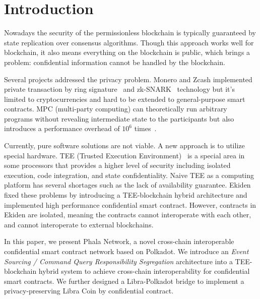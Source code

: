 \section{Introduction}

Nowadays the security of the permissionless blockchain is typically guaranteed by state replication over consensus algorithms. Though this approach works well for blockchain, it also means everything on the blockchain is public, which brings a problem: confidential information cannot be handled by the blockchain.

Several projects addressed the privacy problem. Monero and Zcash implemented private transaction by ring signature~\cite{xxx} and zk-SNARK~\cite{xxx} technology but it's limited to cryptocurrencies and hard to be extended to general-purpose smart contracts. MPC (multi-party computing) can theoretically run arbitrary programs without revealing intermediate state to the participants but also introduces a performance overhead of $10^6$ times~\cite{cheng2019ekiden}.

Currently, pure software solutions are not viable. A new approach is to utilize special hardware. TEE (Trusted Execution Environment)~\cite{teewiki} is a special area in some processors that provides a higher level of security including isolated execution, code integration, and state confidentiality. Naive TEE as a computing platform has several shortages such as the lack of availability guarantee.
Ekiden~\cite{cheng2019ekiden} fixed these problems by introducing a TEE-blockchain hybrid architecture and implemented high performance confidential smart contract. However, contracts in Ekiden are isolated, meaning the contracts cannot interoperate with each other, and cannot interoperate to external blockchains.

In this paper, we present Phala Network, a novel cross-chain interoperable confidential smart contract network based on Polkadot. We introduce an \textit{Event Sourcing / Command Query Responsibility Segregation} architecture into a TEE-blockchain hybrid system to achieve cross-chain interoperability for confidential smart contracts. We further designed a Libra-Polkadot bridge to implement a privacy-preserving Libra Coin by confidential contract.
